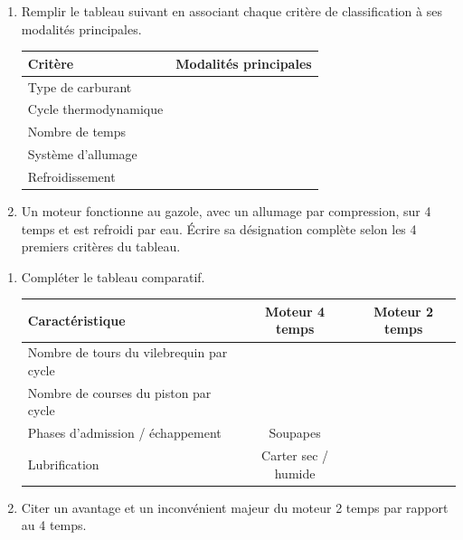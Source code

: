 \documentclass[11pt]{article}
\begin{document}
\begin{exercice}
\begin{enumerate}
    \item Remplir le tableau suivant en associant chaque critère de classification à ses modalités principales.
    \begin{tabular}{|l|p{6cm}|}
    \hline
    \textbf{Critère} & \textbf{Modalités principales} \\
    \hline
    Type de carburant &  \\
    \hline
    Cycle thermodynamique &  \\
    \hline
    Nombre de temps &  \\
    \hline
    Système d'allumage &  \\
    \hline
    Refroidissement &  \\
    \hline
    \end{tabular}
    \item Un moteur fonctionne au gazole, avec un allumage par compression, sur 4 temps et est refroidi par eau. Écrire sa désignation complète selon les 4 premiers critères du tableau.
\end{enumerate}
\end{exercice}

\begin{exercice}
\begin{enumerate}
    \item Compléter le tableau comparatif.
    \begin{tabular}{|l|c|c|}
    \hline
    \textbf{Caractéristique} & \textbf{Moteur 4 temps} & \textbf{Moteur 2 temps} \\
    \hline
    Nombre de tours du vilebrequin par cycle &  &  \\
    \hline
    Nombre de courses du piston par cycle &  &  \\
    \hline
    Phases d'admission / échappement & Soupapes &  \\
    \hline
    Lubrification & Carter sec / humide &  \\
    \hline
    \end{tabular}
    \item Citer un avantage et un inconvénient majeur du moteur 2 temps par rapport au 4 temps.
\end{enumerate}
\end{exercice}
\end{document}
